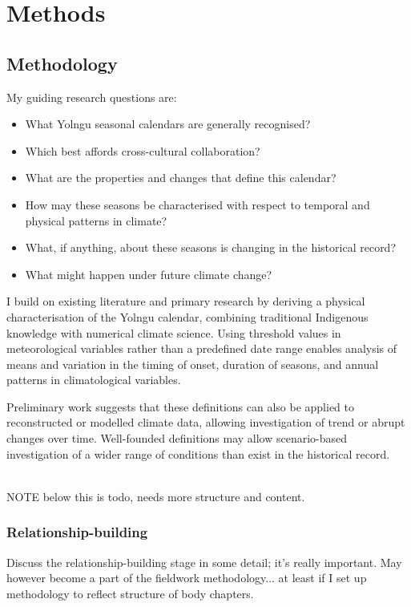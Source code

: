 \chapter{Methods}
\label{ch:methods}

\section{Methodology}

My guiding research questions are:
\begin{itemize}
\item What Yolngu seasonal calendars are generally recognised?
\item Which best affords cross-cultural collaboration?
\item What are the properties and changes that define this calendar?
\item How may these seasons be characterised with respect to temporal and physical patterns in climate?
\item What, if anything, about these seasons is changing in the historical record?
\item What might happen under future climate change?
\end{itemize}

I build on existing literature and primary research by deriving a physical
characterisation of the Yolngu calendar, combining traditional Indigenous
knowledge with numerical climate science. Using threshold values in meteorological
variables rather than a predefined date range enables analysis of means and
variation in the timing of onset, duration of seasons, and annual patterns
in climatological variables.

Preliminary work suggests that these definitions can also be applied to
reconstructed or modelled climate data, allowing investigation of trend
or abrupt changes over time. Well-founded definitions may allow scenario-based
investigation of a wider range of conditions than exist in the historical record. 

~\\
NOTE below this is todo, needs more structure and content.

\subsection{Relationship-building}
Discuss the relationship-building stage in some detail; it's really important.
May however become a part of the fieldwork methodology... at least if I set up
methodology to reflect structure of body chapters.


